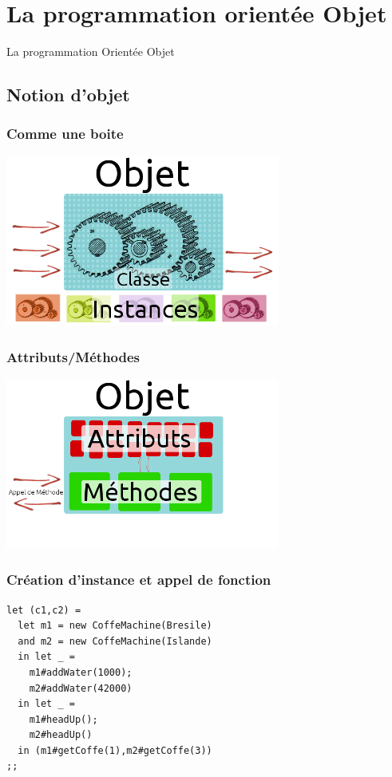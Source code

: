 \section{La programmation orientée Objet}
\begin{frame}
	\begin{center}
	\huge
	La programmation Orientée Objet
	\end{center}
\end{frame}

\subsection{Notion d'objet} %
\begin{frame}
	\frametitle{Comme une boite}
	\begin{center}
	\includegraphics[width=9cm]{pics/explObj1.png}
	\end{center}
\end{frame}
\begin{frame}
	\frametitle{Attributs/Méthodes}
	\begin{center}
	\includegraphics[width=9cm]{pics/explObj2.png}
	\end{center}
\end{frame}
\begin{frame}[fragile]
	\frametitle{Création d'instance et appel de fonction}
	\begin{lstlisting}
let (c1,c2) =
  let m1 = new CoffeMachine(Bresile)
  and m2 = new CoffeMachine(Islande)
  in let _ = 
    m1#addWater(1000);
    m2#addWater(42000)
  in let _ =
    m1#headUp();
    m2#headUp()
  in (m1#getCoffe(1),m2#getCoffe(3))
;;
	\end{lstlisting}
\end{frame}

